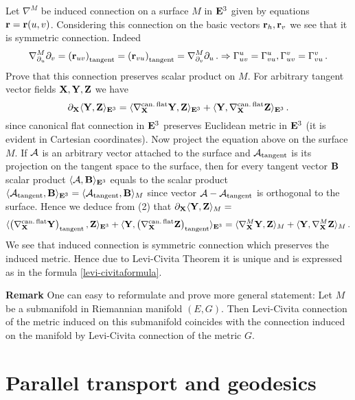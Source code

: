\documentclass[12pt]{article}
\theoremstyle{theorem}
\numberwithin{equation}{section}
\begin{document}
{Let $\nabla^{M}$ be induced connection on a surface $M$  in ${\bf E}^3$ given by equations
${\bf r}={\bf r}(u,v)$. Considering this connection on
the basic vectors ${\bf r}_h,{\bf r}_v$ we see that it is symmetric connection. Indeed
          $$
      \nabla^{M}_{\partial_u}\partial_v=\left({\bf r}_{uv}\right)_{\rm tangent}=\left({\bf r}_{vu}\right)_{\rm tangent}=
          \nabla^{M}_{\partial_v}\partial_u\,. \Rightarrow \Gamma^{u}_{uv}=\Gamma^{u}_{vu},
          \Gamma^{v}_{uv}=\Gamma^{v}_{vu}\,.
          $$
Prove that this connection preserves scalar product on $M$.
For arbitrary tangent vector fields  ${\bf X},{\bf Y},{\bf Z}$ we have
         $$
         \partial_{\bf X}\langle {\bf Y},{\bf Z}\rangle_{{\bf E}^3}=\langle \nabla_{\bf X} ^{\rm can.\,flat}{\bf Y},{\bf Z}\rangle_{{\bf E}^3}+
    \langle {\bf Y},\nabla_{\bf X} ^{\rm can.\,flat}{\bf Z}\rangle_{{\bf E}^3}\,.
         $$
since canonical flat connection in ${\bf E}^3$
preserves Euclidean metric in ${\bf E}^3$ (it is evident in Cartesian coordinates).
Now project the equation above on the surface $M$.
If ${\cal A}$ is an arbitrary vector attached to the surface and ${\cal A}_{\rm tangent}$ is its
 projection on the tangent space to the surface, then
 for every tangent vector $\bf B$ scalar product $\langle{\cal A},{\bf B}\rangle_{{\bf E}^3}$ equals to
 the scalar product $\langle{\cal A}_{\rm tangent},{\bf B}\rangle_{{\bf E}^3}=
 \langle{\cal A}_{\rm tangent},{\bf B}\rangle_{M}$
  since vector ${\cal A}-{\cal A}_{\rm tangent}$
 is orthogonal to the surface.  Hence we deduce from  (2) that  $ \partial_{\bf X}\langle {\bf Y},{\bf Z}\rangle_{M}=$
                    $$
   \langle \left(\nabla_{\bf X} ^{\rm can.\,flat}{\bf Y}\right)_{\rm tangent},{\bf Z}\rangle_{{\bf E}^3}+
    \langle {\bf Y},\left(\nabla_{\bf X} ^{\rm can.\,flat}{\bf Z}\right)_{\rm tangent}\rangle_{{\bf E}^3}=
                    \langle \nabla_{\bf X} ^{M}{\bf Y},{\bf Z}\rangle_{M}+
    \langle {\bf Y},\nabla_{\bf X} ^{M}{\bf Z}\rangle_{M}\,.
                    $$
 We see that induced connection is symmetric connection which preserves the induced metric.
 Hence due to Levi-Civita Theorem it is unique and is expressed as in the formula \eqref{levi-civitaformula}.

\m




{\bf Remark} {\footnotesize One can easy to reformulate and prove more general statement:
Let $M$ be a submanifold in Riemannian manifold $(E,G)$. Then Levi-Civita connection
of the metric induced on this submanifold coincides with the connection induced on the manifold
by Levi-Civita connection of the metric $G$.}


\medskip



   \section {Parallel transport and geodesics}

}
\end{document}
